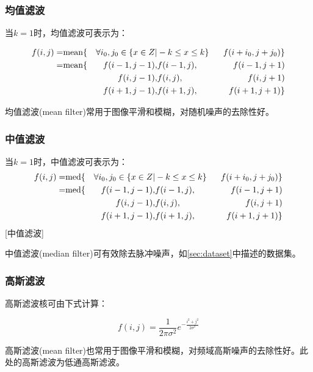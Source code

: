 \subsubsection{均值滤波}
\label{sec:mean-filter0}

当$k=1$时，均值滤波可表示为：

\begin{alignat}{3}
    f(i, j) =& \rm{mean} \{& \forall{i_0, j_0} \in \{ x \in {Z} | &  -k \leq x \leq k\}~&~f(i + i_0, j + j_0)\}\\
    =&\rm{mean} \{& f(i - 1, j - 1),& f(i - 1, j),& f(i - 1, j + 1)\notag\\
    && f(i, j - 1),& f(i, j),& f(i, j + 1)\notag\\
    && f(i + 1, j - 1),& f(i + 1, j),& f(i + 1, j + 1)\}\notag
\end{alignat}

均值滤波(mean filter)常用于图像平滑和模糊，对随机噪声的去除性好。

\subsubsection{中值滤波}
\label{sec:median-filter0}

当$k=1$时，中值滤波可表示为：
\begin{alignat}{3}
    f(i, j) =& \rm{med} \{& \forall{i_0, j_0} \in \{ x \in {Z} | &  -k \leq x \leq k\}~&~f(i + i_0, j + j_0)\}\\
    =&\rm{med} \{& f(i - 1, j - 1),& f(i - 1, j),& f(i - 1, j + 1)\notag\\
    && f(i, j - 1),& f(i, j),& f(i, j + 1)\notag\\
    && f(i + 1, j - 1),& f(i + 1, j),& f(i + 1, j + 1)\}\notag
\end{alignat}[中值滤波]

中值滤波(median filter)可有效除去脉冲噪声，如\autoref{sec:dataset}中描述的数据集。\cite{Arakawa_1996}

\subsubsection{高斯滤波}
\label{sec:gaussian-filter0}

高斯滤波核可由下式计算：

\begin{equation}
    f(i,j) =\frac{1}{2\pi\sigma^2}e^{-\frac{i^2+j^2}{2\sigma^2}}
\end{equation}

高斯滤波(mean filter)也常用于图像平滑和模糊，对频域高斯噪声的去除性好。此处的高斯滤波为低通高斯滤波。

